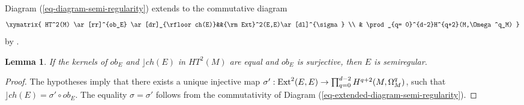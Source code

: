 \documentclass[12pt]{amsart}
\newcommand{\hide}[1]{}
\numberwithin{equation}{subsection}
\theoremstyle{plain}
\newtheorem{lem}[thm]{Lemma}
\theoremstyle{definition}
\newcommand{\StructureSheaf}[1]{{\mathcal O}_{#1}}
\newcommand{\Ext}{{\rm Ext}}
\newcommand{\Contract}{\rfloor}
\begin{document}
Diagram (\ref{eq-diagram-semi-regularity}) extends to the commutative diagram
\begin{equation}
\label{eq-extended-diagram-semi-regularity}
\xymatrix{
HT^2(M) \ar[rr]^{ob_E} \ar[dr]_{\Contract ch(E)}&&\Ext^2(E,E)\ar[dl]^{\sigma}
\\
&
\prod_{q= 0}^{d-2}H^{q+2}(M,\Omega^q_M)
}
\end{equation}
by \cite[Prop. 6.2.1 and Cor. 6.3.2]{buchweitz-flenner-HH}.
\hide{
The commutativity of (\ref{eq-extended-diagram-semi-regularity}) is proved by restricting to each of the three direct summands of $HT^2(M)=H^2(\StructureSheaf{M})\oplus H^1(TM)\oplus H^0(\wedge^2TM)$.
The commutativity of the restrictions to $H^2(\StructureSheaf{M})$ follows from the equality $ch(E)=Tr(at_E)$ and the equality
$Tr(at_E)\cup\alpha=Tr(at_E\circ (\alpha\cdot id_E))$, for all $\alpha\in H^2(\StructureSheaf{M})$. The restriction to $H^1(TM)$
is the commutative diagram (\ref{eq-diagram-semi-regularity}). The commutativity of the restriction to $H^0(\wedge^2TM)$
is equivalent to the equality
\[
(k+2)(k+1)Tr\left(\langle\xi,at_E^2\rangle\cdot at_E^k\right)=
2\langle\xi,Tr\left(at_E^{k+2}\right)\rangle,
\]
for all $\xi\in H^0(\wedge^2TM)$. When $M$ is an abelian variety, then it suffices to prove the latter equality for 
$\xi=\xi_1\wedge\xi_2$, with $\xi_i\in H^0(TM)$. In that case the above identity follows from a repeated use of the equality
\[
(j+1)Tr\left(\langle\xi,at_E\rangle\cdot at_E^j\right)=
\langle\xi,Tr\left(at_E^{j+1}\right)\rangle,
\]
where the latter is proved by the same argument as in \cite[Prop. 4.2]{buchweitz-flenner}. The general case follows from 
a computation using a \v{C}ech cocycle representing $at_E$ as in \cite[Sec. 10.1.5]{huybrechts-lehn} in order to carry the above argument locally. 
}

\begin{lem}
\label{lemma-criterion-for-semiregularity}
If the kernels of $ob_E$ and $\Contract ch(E)$ in $HT^2(M)$ are equal  and $ob_E$ is surjective, then $E$ is semiregular.
\end{lem}

\begin{proof}
The hypotheses imply that there exists a unique injective map $\sigma':\Ext^2(E,E)\rightarrow \prod_{q= 0}^{d-2}H^{q+2}(M,\Omega^q_M)$, such that 
$\Contract ch(E)=\sigma'\circ ob_E.$
The equality $\sigma=\sigma'$ follows from the commutativity of Diagram (\ref{eq-extended-diagram-semi-regularity}). 
\end{proof}
\end{document}
